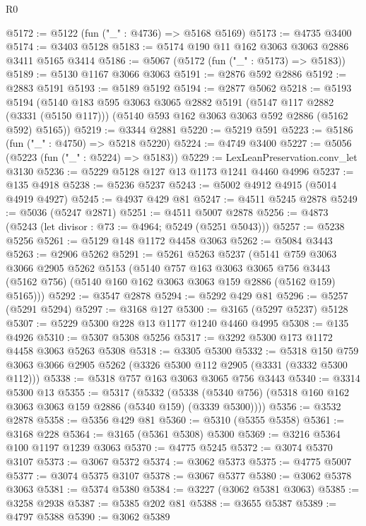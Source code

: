 \begin{lexlean}{R0}
\begin{coremodule}
@5172 := @5122 (fun ("_" : @4736) => @5168 @5169)
@5173 := @4735 @3400
@5174 := @3403 @5128
@5183 := @5174 @190 @11 @162 @3063 @3063 @2886 @3411 @5165 @3414
@5186 := @5067 (@5172 (fun ("_" : @5173) => @5183))
@5189 := @5130 @1167 @3066 @3063
@5191 := @2876 @592 @2886
@5192 := @2883 @5191
@5193 := @5189 @5192
@5194 := @2877 @5062
@5218 := @5193
    @5194
    (@5140
      @183
      @595
      @3063
      @3065
      @2882
      @5191
      (@5147 @117 @2882 (@3331 (@5150 @117)))
      (@5140 @593 @162 @3063 @3063 @592 @2886 (@5162 @592) @5165))
@5219 := @3344 @2881
@5220 := @5219 @591
@5223 := @5186 (fun ("_" : @4750) => @5218 @5220)
@5224 := @4749 @3400
@5227 := @5056 (@5223 (fun ("_" : @5224) => @5183))
@5229 := LexLeanPreservation.conv_let @3130
@5236 := @5229 @5128 @127 @13 @1173 @1241 @4460 @4996
@5237 := @135 @4918
@5238 := @5236 @5237
@5243 := @5002 @4912 @4915 (@5014 @4919 @4927)
@5245 := @4937 @429 @81
@5247 := @4511 @5245 @2878
@5249 := @5036 (@5247 @2871)
@5251 := @4511 @5007 @2878
@5256 := @4873 (@5243 (let divisor : @73 := @4964; @5249 (@5251 @5043)))
@5257 := @5238 @5256
@5261 := @5129 @148 @1172 @4458 @3063
@5262 := @5084 @3443
@5263 := @2906 @5262
@5291 := @5261
    @5263
    @5237
    (@5141
      @759
      @3063
      @3066
      @2905
      @5262
      @5153
      (@5140
        @757
        @163
        @3063
        @3065
        @756
        @3443
        (@5162 @756)
        (@5140 @160 @162 @3063 @3063 @159 @2886 (@5162 @159) @5165)))
@5292 := @3547 @2878
@5294 := @5292 @429 @81
@5296 := @5257 (@5291 @5294)
@5297 := @3168 @127
@5300 := @3165 (@5297 @5237) @5128
@5307 := @5229 @5300 @228 @13 @1177 @1240 @4460 @4995
@5308 := @135 @4926
@5310 := @5307 @5308 @5256
@5317 := @3292 @5300 @173 @1172 @4458 @3063 @5263 @5308
@5318 := @3305 @5300
@5332 := @5318 @150 @759 @3063 @3066 @2905 @5262 (@3326 @5300 @112 @2905 (@3331 (@3332 @5300 @112)))
@5338 := @5318 @757 @163 @3063 @3065 @756 @3443
@5340 := @3314 @5300 @13
@5355 := @5317
    (@5332 (@5338 (@5340 @756) (@5318 @160 @162 @3063 @3063 @159 @2886 (@5340 @159) (@3339 @5300))))
@5356 := @3532 @2878
@5358 := @5356 @429 @81
@5360 := @5310 (@5355 @5358)
@5361 := @3168 @228
@5364 := @3165 (@5361 @5308) @5300
@5369 := @3216 @5364 @100 @1197 @1239 @3063
@5370 := @4775 @5245
@5372 := @3074 @5370 @3107
@5373 := @3067 @5372
@5374 := @3062 @5373
@5375 := @4775 @5007
@5377 := @3074 @5375 @3107
@5378 := @3067 @5377
@5380 := @3062 @5378 @3063
@5381 := @5374 @5380
@5384 := @3227 (@3062 @5381 @3063)
@5385 := @3258 @2938
@5387 := @5385 @202 @81
@5388 := @3655 @5387
@5389 := @4797 @5388
@5390 := @3062 @5389

\end{coremodule}
\end{lexlean}
